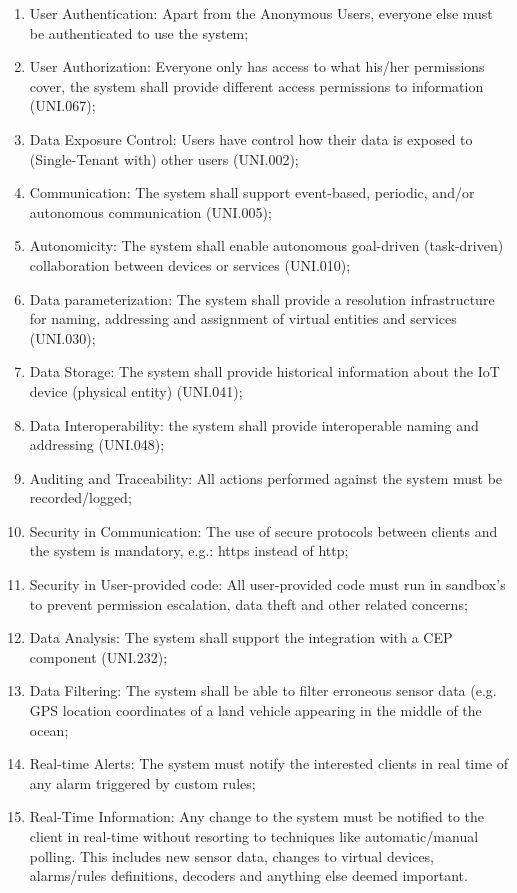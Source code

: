 \begin{enumerate}
    \item User Authentication: Apart from the Anonymous Users, everyone else must be authenticated to use the system;
    \item User Authorization: Everyone only has access to what his/her permissions cover, the system shall provide different access permissions to information (UNI.067);
    \item Data Exposure Control: Users have control how their data is exposed to (Single-Tenant with) other users (UNI.002);
    \item Communication: The system shall support event-based, periodic, and/or autonomous communication (UNI.005);
    \item Autonomicity: The system shall enable autonomous goal-driven (task-driven) collaboration between devices or services (UNI.010);
    \item Data parameterization: The system shall provide a resolution infrastructure for naming, addressing and assignment of virtual entities and services (UNI.030);
    \item Data Storage: The system shall provide historical information about the \gls{IoT} device (physical entity) (UNI.041);
    \item Data Interoperability: the system  shall provide interoperable naming and addressing (UNI.048);
    \item Auditing and Traceability: All actions performed against the system must be recorded/logged;
    \item Security in Communication: The use of secure protocols between clients and the system is mandatory, e.g.: https instead of http;
    \item Security in User-provided code: All user-provided code must run in sandbox's to prevent permission escalation, data theft and other related concerns;
    \item Data Analysis: The system shall support the integration with a \gls{CEP} component (UNI.232);
    \item Data Filtering: The system shall be able to filter erroneous sensor data (e.g. GPS location coordinates of a land vehicle appearing in the middle of the ocean;
    \item Real-time Alerts: The system must notify the interested clients in real time of any alarm triggered by custom rules;
    \item Real-Time Information: Any change to the system must be notified to the client in real-time without resorting to techniques like automatic/manual polling. This includes new sensor data, changes to virtual devices, alarms/rules definitions, decoders and anything else deemed important.
\end{enumerate}

